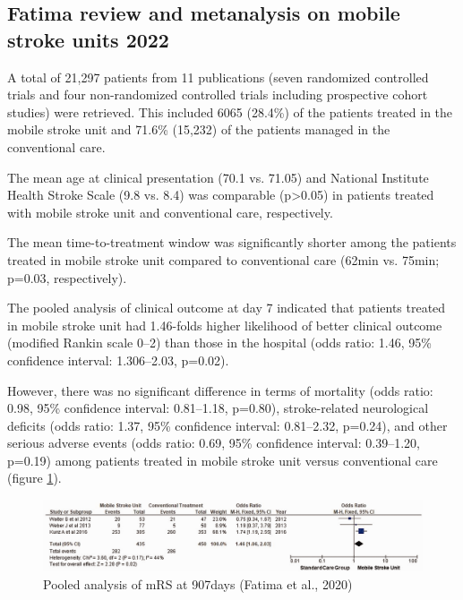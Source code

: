 
\subsection{Fatima review and metanalysis on mobile stroke units 2022 \cite{fatima_mobile_2020}
}

A total of 21,297 patients from 11 publications (seven randomized controlled trials and four non-randomized controlled trials including prospective cohort studies) were retrieved. This included 6065 (28.4\%) of the patients treated in the mobile stroke unit and 71.6\% (15,232) of the patients managed in the conventional care.

The mean age at clinical presentation (70.1 vs. 71.05) and National Institute Health Stroke Scale (9.8 vs. 8.4) was comparable (p>0.05) in patients treated with mobile stroke unit and conventional care, respectively.

The mean time-to-treatment window was significantly shorter among the patients treated in mobile stroke unit compared to conventional care (62min vs. 75min; p=0.03, respectively).

The pooled analysis of clinical outcome at day 7 indicated that patients treated in mobile stroke unit had 1.46-folds higher likelihood of better clinical outcome (modified Rankin scale 0–2) than those in the hospital (odds ratio: 1.46, 95\% confidence interval: 1.306–2.03, p=0.02).

However, there was no significant difference in terms of mortality (odds ratio: 0.98, 95\% confidence interval: 0.81–1.18, p=0.80), stroke-related neurological deficits (odds ratio: 1.37, 95\% confidence interval: 0.81–2.32, p=0.24), and other serious adverse events (odds ratio: 0.69, 95\% confidence interval: 0.39–1.20, p=0.19) among patients treated in mobile stroke unit versus conventional care (figure \ref{fig:background_fatima_fig_5}).

\begin{figure}
    \centering
    \includegraphics[width=0.5\linewidth]{images_background/fatima_fig_5}
    \caption{Pooled analysis of mRS at 907days (Fatima et al., 2020)}
    \label{fig:background_fatima_fig_5}
\end{figure}

